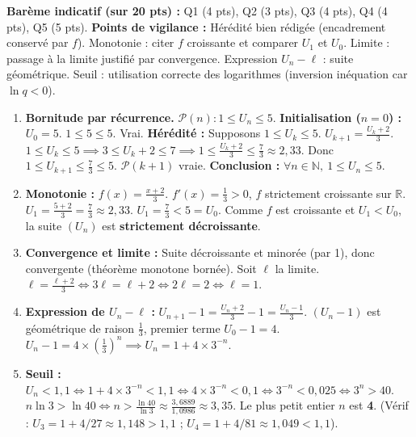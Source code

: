 \documentclass[11pt]{article}
\begin{document}
\begin{corrige}
\textbf{Barème indicatif (sur 20 pts) :} Q1 (4 pts), Q2 (3 pts), Q3 (4 pts), Q4 (4 pts), Q5 (5 pts).
\textbf{Points de vigilance :} Hérédité bien rédigée (encadrement conservé par $f$). Monotonie : citer $f$ croissante et comparer $U_1$ et $U_0$. Limite : passage à la limite justifié par convergence. Expression $U_n-\ell$ : suite géométrique. Seuil : utilisation correcte des logarithmes (inversion inéquation car $\ln q < 0$).
\begin{enumerate}
    \item \textbf{Bornitude par récurrence.}
    $\mathcal{P}(n) : 1 \le U_n \le 5$.
    \textbf{Initialisation ($n=0$) :} $U_0 = 5$. $1 \le 5 \le 5$. Vrai.
    \textbf{Hérédité :} Supposons $1 \le U_k \le 5$.
    $U_{k+1} = \frac{U_k + 2}{3}$.
    $1 \le U_k \le 5 \implies 3 \le U_k + 2 \le 7 \implies 1 \le \frac{U_k+2}{3} \le \frac{7}{3} \approx 2,33$.
    Donc $1 \le U_{k+1} \le \frac{7}{3} \le 5$. $\mathcal{P}(k+1)$ vraie.
    \textbf{Conclusion :} $\forall n \in \mathbb{N},\ 1 \le U_n \le 5$.
    \item \textbf{Monotonie :}
    $f(x) = \frac{x+2}{3}$. $f'(x) = \frac{1}{3} > 0$, $f$ strictement croissante sur $\mathbb{R}$.
    $U_1 = \frac{5+2}{3} = \frac{7}{3} \approx 2,33$.
    $U_1 = \frac{7}{3} < 5 = U_0$.
    Comme $f$ est croissante et $U_1 < U_0$, la suite $(U_n)$ est \textbf{strictement décroissante}.
    \item \textbf{Convergence et limite :}
    Suite décroissante et minorée (par 1), donc convergente (théorème monotone bornée).
    Soit $\ell$ la limite. $\ell = \frac{\ell+2}{3} \iff 3\ell = \ell+2 \iff 2\ell=2 \iff \ell = 1$.
    \item \textbf{Expression de $U_n - \ell$ :}
    $U_{n+1} - 1 = \frac{U_n+2}{3} - 1 = \frac{U_n - 1}{3}$.
    $(U_n - 1)$ est géométrique de raison $\frac{1}{3}$, premier terme $U_0 - 1 = 4$.
    $U_n - 1 = 4 \times \left(\frac{1}{3}\right)^n \implies U_n = 1 + 4 \times 3^{-n}$.
    \item \textbf{Seuil :} $U_n < 1,1 \iff 1 + 4 \times 3^{-n} < 1,1 \iff 4 \times 3^{-n} < 0,1 \iff 3^{-n} < 0,025 \iff 3^n > 40$.
    $n \ln 3 > \ln 40 \iff n > \frac{\ln 40}{\ln 3} \approx \frac{3,6889}{1,0986} \approx 3,35$.
    Le plus petit entier $n$ est \textbf{4}.
    (Vérif : $U_3 = 1 + 4/27 \approx 1,148 > 1,1$ ; $U_4 = 1 + 4/81 \approx 1,049 < 1,1$).
\end{enumerate}
\end{corrige}
\end{document}
